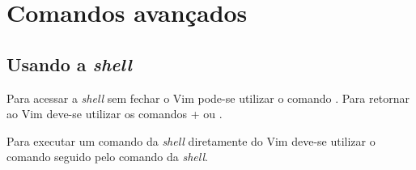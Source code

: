 % 
% 
% 
% 
% 
\chapter{Comandos avançados} \label{sch:vim:advance}
\section{Usando a \textit{shell}}

Para acessar a \textit{shell} sem fechar o Vim pode-se utilizar o comando . Para retornar ao Vim deve-se utilizar os comandos + ou .

Para executar um comando da \textit{shell} diretamente do Vim deve-se utilizar o comando \lcode{:!} seguido pelo comando da \textit{shell}.

